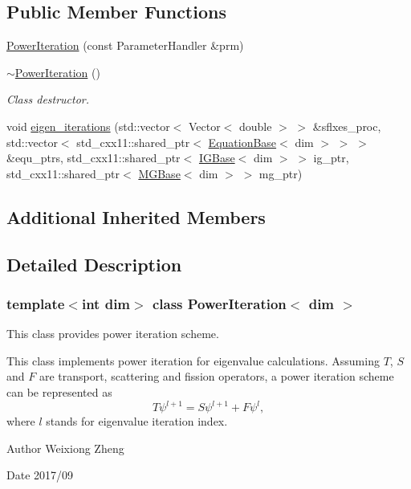 \subsection*{Public Member Functions}
\begin{DoxyCompactItemize}
\item 
\hyperlink{class_power_iteration_a2608445223ce7d27b24be0f9d7042554}{Power\+Iteration} (const Parameter\+Handler \&prm)
\item 
\hyperlink{class_power_iteration_ad660a351afc4f23b1bcf7b334ef033dd}{$\sim$\+Power\+Iteration} ()
\begin{DoxyCompactList}\small\item\em Class destructor. \end{DoxyCompactList}\item 
void \hyperlink{class_power_iteration_a583586002126f8b7a523e95327047cba}{eigen\+\_\+iterations} (std\+::vector$<$ Vector$<$ double $>$ $>$ \&sflxes\+\_\+proc, std\+::vector$<$ std\+\_\+cxx11\+::shared\+\_\+ptr$<$ \hyperlink{class_equation_base}{Equation\+Base}$<$ dim $>$ $>$ $>$ \&equ\+\_\+ptrs, std\+\_\+cxx11\+::shared\+\_\+ptr$<$ \hyperlink{class_i_g_base}{I\+G\+Base}$<$ dim $>$ $>$ ig\+\_\+ptr, std\+\_\+cxx11\+::shared\+\_\+ptr$<$ \hyperlink{class_m_g_base}{M\+G\+Base}$<$ dim $>$ $>$ mg\+\_\+ptr)
\end{DoxyCompactItemize}
\subsection*{Additional Inherited Members}


\subsection{Detailed Description}
\subsubsection*{template$<$int dim$>$\newline
class Power\+Iteration$<$ dim $>$}

This class provides power iteration scheme. 

This class implements power iteration for eigenvalue calculations. Assuming $T$, $S$ and $F$ are transport, scattering and fission operators, a power iteration scheme can be represented as \[ T\psi^{l+1}=S\psi^{l+1}+F\psi^l, \] where $l$ stands for eigenvalue iteration index.

\begin{DoxyAuthor}{Author}
Weixiong Zheng 
\end{DoxyAuthor}
\begin{DoxyDate}{Date}
2017/09 
\end{DoxyDate}


